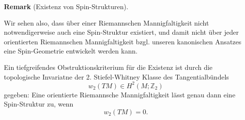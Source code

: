 \documentclass[10pt, letterpaper]{article}
\newcommand{\CustomHeading}[3]{%
  \par\medskip\noindent%
  \textbf{#1 #2} \textnormal{(#3)}.\enskip%
}
\newenvironment{REM}[2]{\CustomHeading{Remark}{#1}{#2}}{}
\begin{document}
\begin{REM}{}{Existenz von Spin-Strukturen}
    Wir sehen also, dass über einer Riemannschen Mannigfaltigkeit nicht notwendigerweise auch eine Spin-Struktur existiert, und damit nicht über jeder orientierten Riemannschen Mannigfaltigkeit bzgl. unseren kanonischen Ansatzes eine Spin-Geometrie entwickelt werden kann. 
    
    Ein tiefgreifendes Obstruktionskriterium für die Existenz ist durch die topologische Invariatne der 2. Stiefel-Whitney Klasse des Tangentialbündels 
    $$w_2(TM) \in H^2\left(M ; \mathbb{Z}_2\right)$$ gegeben: Eine orientierte Riemannsche Mannigfaltigkeit lässt genau dann eine Spin-Struktur zu, wenn  
    \[
    w_2(TM)=0.
    \] 
\end{REM}
\end{document}
